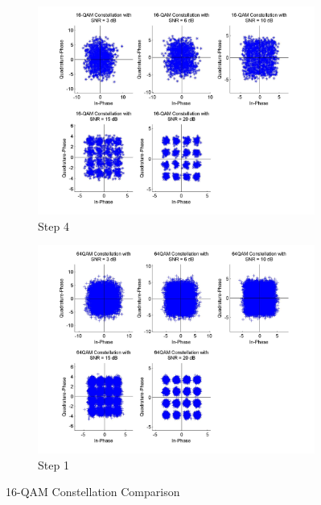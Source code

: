 \documentclass[]{article}
\begin{document}
\newpage
\begin{figure}[h]
        \centering
        \begin{subfigure}[b]{0.6\textwidth}
                \includegraphics[width=\textwidth]{qam16Const.jpg}
                \caption{Step 4}
                \label{fig:qam16Const}
        \end{subfigure}%
        \qquad \quad %
        \begin{subfigure}[b]{0.6\textwidth}
                \includegraphics[width=\textwidth]{qam16Const1.jpg}
                \caption{Step 1}
                \label{fig:qam16Const1}
        \end{subfigure}
        \caption{16-QAM Constellation Comparison }
\end{figure}
\end{document}
